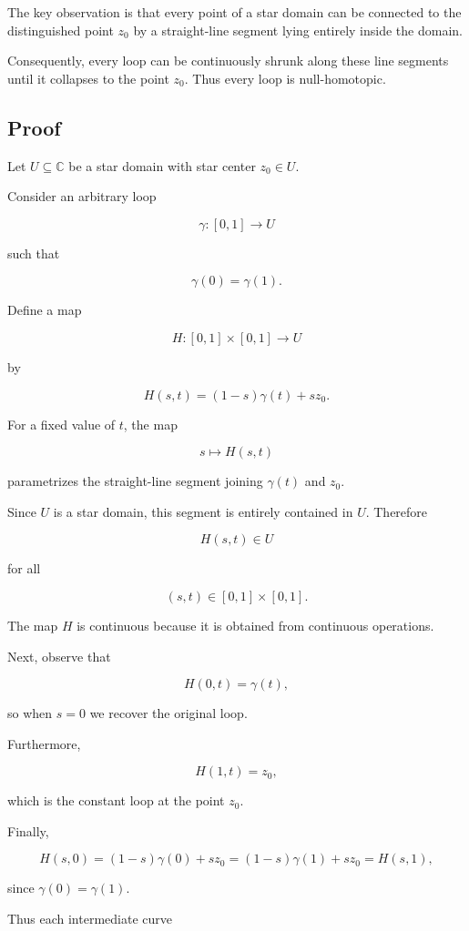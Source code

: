 \documentclass[12pt,a4paper]{article}
\theoremstyle{notespace}
\begin{document}
The key observation is that every point of a star domain can be connected to the distinguished point \(z_0\) by a straight-line segment lying entirely inside the domain.

Consequently, every loop can be continuously shrunk along these line segments until it collapses to the point \(z_0\). Thus every loop is null-homotopic.

\subsection{Proof}

Let \(U\subseteq\mathbb C\) be a star domain with star center \(z_0\in U\).

Consider an arbitrary loop

\[
\gamma:[0,1]\to U
\]

such that

\[
\gamma(0)=\gamma(1).
\]

Define a map

\[
H:[0,1]\times[0,1]\to U
\]

by

\[
H(s,t)
=
(1-s)\gamma(t)+sz_0.
\]

For a fixed value of \(t\), the map

\[
s\mapsto H(s,t)
\]

parametrizes the straight-line segment joining \(\gamma(t)\) and \(z_0\).

Since \(U\) is a star domain, this segment is entirely contained in \(U\). Therefore

\[
H(s,t)\in U
\]

for all

\[
(s,t)\in[0,1]\times[0,1].
\]

The map \(H\) is continuous because it is obtained from continuous operations.

Next, observe that

\[
H(0,t)=\gamma(t),
\]

so when \(s=0\) we recover the original loop.

Furthermore,

\[
H(1,t)=z_0,
\]

which is the constant loop at the point \(z_0\).

Finally,

\[
H(s,0)
=
(1-s)\gamma(0)+sz_0
=
(1-s)\gamma(1)+sz_0
=
H(s,1),
\]

since \(\gamma(0)=\gamma(1)\).

Thus each intermediate curve
\end{document}
